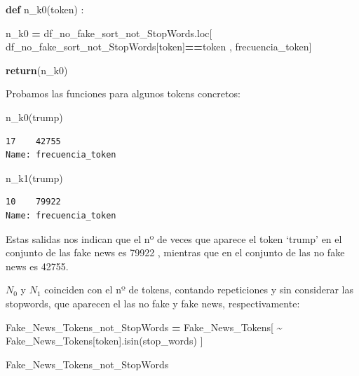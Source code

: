 \documentclass[
  11pt,
  a4paper,
]{article}
\newenvironment{Shaded}{\begin{snugshade}}{\end{snugshade}}
\newcommand{\ControlFlowTok}[1]{\textcolor[rgb]{0.13,0.29,0.53}{\textbf{#1}}}
\newcommand{\KeywordTok}[1]{\textcolor[rgb]{0.13,0.29,0.53}{\textbf{#1}}}
\newcommand{\NormalTok}[1]{#1}
\newcommand{\OperatorTok}[1]{\textcolor[rgb]{0.81,0.36,0.00}{\textbf{#1}}}
\newcommand{\StringTok}[1]{\textcolor[rgb]{0.31,0.60,0.02}{#1}}
\begin{document}
\begin{Shaded}
\begin{Highlighting}[]
\KeywordTok{def}\NormalTok{ n\_k0(token) : }

\NormalTok{    n\_k0 }\OperatorTok{=}\NormalTok{ df\_no\_fake\_sort\_not\_StopWords.loc[ df\_no\_fake\_sort\_not\_StopWords[}\StringTok{\textquotesingle{}token\textquotesingle{}}\NormalTok{]}\OperatorTok{==}\NormalTok{token , }\StringTok{\textquotesingle{}frecuencia\_token\textquotesingle{}}\NormalTok{]}

    \ControlFlowTok{return}\NormalTok{(n\_k0)}
\end{Highlighting}
\end{Shaded}

Probamos las funciones para algunos tokens concretos:

\begin{Shaded}
\begin{Highlighting}[]
\NormalTok{n\_k0(}\StringTok{\textquotesingle{}trump\textquotesingle{}}\NormalTok{) }
\end{Highlighting}
\end{Shaded}

\begin{verbatim}
17    42755
Name: frecuencia_token 
\end{verbatim}

\begin{Shaded}
\begin{Highlighting}[]
\NormalTok{n\_k1(}\StringTok{\textquotesingle{}trump\textquotesingle{}}\NormalTok{) }
\end{Highlighting}
\end{Shaded}

\begin{verbatim}
10    79922
Name: frecuencia_token 
\end{verbatim}

Estas salidas nos indican que el nº de veces que aparece el token
`trump' en el conjunto de las fake news es 79922 , mientras que en el
conjunto de las no fake news es 42755.

\(N_0\) y \(N_1\) coinciden con el nº de tokens, contando repeticiones y
sin considerar las stopwords, que aparecen el las no fake y fake news,
respectivamente:

\begin{Shaded}
\begin{Highlighting}[]
\NormalTok{Fake\_News\_Tokens\_not\_StopWords }\OperatorTok{=}\NormalTok{ Fake\_News\_Tokens[ }\OperatorTok{\textasciitilde{}}\NormalTok{ Fake\_News\_Tokens[}\StringTok{\textquotesingle{}token\textquotesingle{}}\NormalTok{].isin(stop\_words) ]}

\NormalTok{Fake\_News\_Tokens\_not\_StopWords}
\end{Highlighting}
\end{Shaded}
\end{document}
